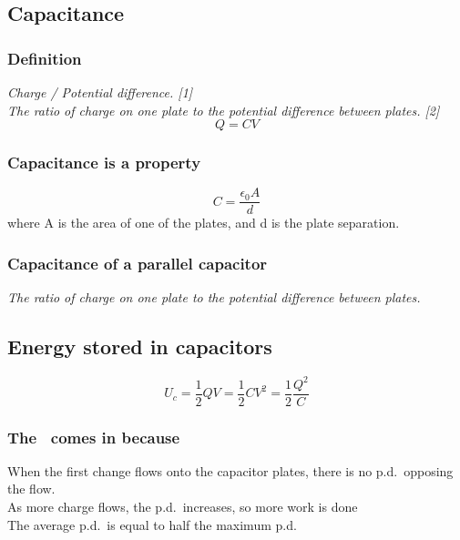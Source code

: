 \documentclass[a4paper,9pt]{scrartcl}
\begin{document}
    \subsection{Capacitance}

    \subsubsection{Definition}
    \textit{Charge / Potential difference. [1]}\\
    \textit{The ratio of charge on one plate to the potential difference between plates. [2]}\\
    \begin{displaymath}
        Q = CV
    \end{displaymath}

    \subsubsection{Capacitance is a property}
    \begin{displaymath}
        C = \frac{\epsilon_{0}A}{d}
    \end{displaymath}
    where A is the area of one of the plates, and d is the plate separation.

    \subsubsection{Capacitance of a parallel capacitor}
    \textit{The ratio of charge on one plate to the potential difference between plates.}

    \subsection{Energy stored in capacitors}
    \begin{displaymath}
        U_c = \label{half}\frac{1}{2}QV = \frac{1}{2}CV^2 = \frac{1}{2}\frac{Q^2}{C}
    \end{displaymath}

    \subsubsection{The\ \cite[half]{half} comes in because}
    When the first change flows onto the capacitor plates, there is no p.d.\ opposing the flow.\\
    As more charge flows, the p.d.\ increases, so more work is done\\
    The average p.d.\ is equal to half the maximum p.d.\\
\end{document}
